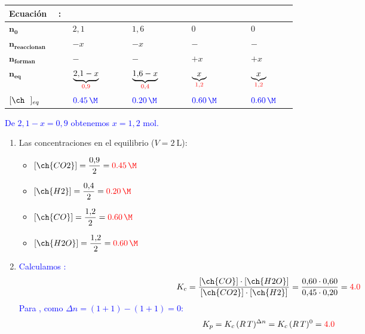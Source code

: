 \begin{exerciseEVAU}
\begin{solu}
\begin{table}[H]
\begin{tabular}{@{}C{0.16\linewidth} @{\,}c@{\,} C{0.16\linewidth} @{\,}c@{\,} C{0.16\linewidth} @{\,}c@{\,} C{0.16\linewidth} @{\,}c@{\,} C{0.16\linewidth}@{}}
                \textbf{Ecuación} & : & \textbf{} & \ch{+} & \textbf{} & \ch{->} & \textbf{} & \ch{+} & \textbf{} \\
                \midrule
                \(\bm{n_0}\) &  & \(2{,}1\) &  & \(1{,}6\) &  & \(0\) &  & \(0\) \\[3pt]
                \(\bm{n_{\text{reaccionan}}}\) &  & \(-x\) &  & \(-x\) &  & \(-\) &  & \(-\) \\[3pt]
                \(\bm{n_{\text{forman}}}\) &  & \(-\) &  & \(-\) &  & \(+x\) &  & \(+x\) \\[3pt]
                \(\bm{n_{\text{eq}}}\) &  & \(\underbrace{2{,}1-x}_{{\color{red}0{,}9}}\) &  & \(\underbrace{1{,}6-x}_{{\color{red}0{,}4}}\) &  & \(\underbrace{x}_{{\color{red}1{,}2}}\) &  & \(\underbrace{x}_{{\color{red}1{,}2}}\) \\[3pt]
                \(\conc{\ \ }_{eq}\) &  & \({\color{blue}\qty{0{,}45}{\M}}\) &  & \({\color{blue}\qty{0{,}20}{\M}}\) &  & \({\color{blue}\qty{0{,}60}{\M}}\) &  & \({\color{blue}\qty{0{,}60}{\M}}\) \\
                \bottomrule
            \end{tabular}
        \end{table}

    \textcolor{blue}{De \(2{,}1 - x = 0{,}9\) obtenemos \(x = 1{,}2\) mol.}

    \begin{enumerate}[label=\letraminuscula]
        \item Las concentraciones en el equilibrio (\(V = \qty{2}{\L}\)):
        \begin{multicols}{2}
            \begin{itemize}
                \item \([\ch{CO2}] = \dfrac{0{,}9}{2} = \textcolor{red}{\qty{0{,}45}{\M}}\)
                \item \([\ch{H2}] = \dfrac{0{,}4}{2} = \textcolor{red}{\qty{0{,}20}{\M}}\)
                \item \([\ch{CO}] = \dfrac{1{,}2}{2} = \textcolor{red}{\qty{0{,}60}{\M}}\)
                \item \([\ch{H2O}] = \dfrac{1{,}2}{2} = \textcolor{red}{\qty{0{,}60}{\M}}\)
            \end{itemize}
        \end{multicols}

        \item \textcolor{blue}{Calculamos \Kc{}:}
        \[
            K_c = \frac{[\ch{CO}]\cdot[\ch{H2O}]}{[\ch{CO2}]\cdot[\ch{H2}]} = \frac{0{,}60 \cdot 0{,}60}{0{,}45 \cdot 0{,}20} = \textcolor{red}{\num{4{,}0}}
        \]
        \textcolor{blue}{Para \Kp{}, como \(\Delta n = (1+1)-(1+1) = 0\):}
        \[
            K_p = K_c\,(R\,T)^{\Delta n} = K_c\,(R\,T)^0 = \textcolor{red}{\num{4{,}0}}
        \]


\end{enumerate}
\end{solu}
\end{exerciseEVAU}
